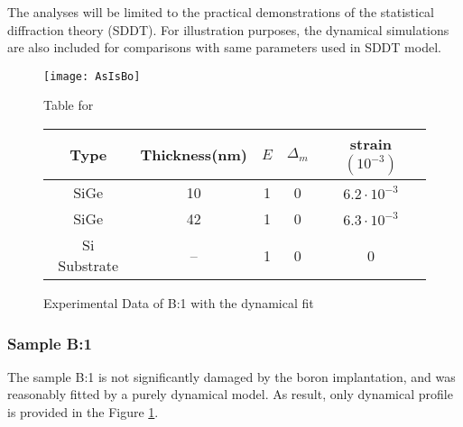 The analyses will be limited to the practical demonstrations of the statistical diffraction theory (SDDT).  For illustration purposes, the dynamical simulations are also included for comparisons with same parameters used in SDDT model.

%
\begin{figure}[ht]
\caption{Experimental Data of B:1 with the dynamical fit}
\label{B1:fig}
\begin{minipage}{\linewidth}
\texttt{[image: AsIsBo]}
\end{minipage}
\vfill
\begin{minipage}{\linewidth}
\vspace{10pt}
\centering
Table for \\
\begin{tabular}[htbp]{@{}c|cccc@{}}
    \hline
  Type & Thickness(nm) & $E$ & $\Delta_m$ & strain $(10^{-3})$ \\
    \hline
  SiGe & 10 & 1 & 0 & $6.2\cdot 10^{-3}$  \\
  SiGe & 42 & 1 & 0 & $6.3\cdot 10^{-3}$  \\
  Si Substrate & -- & 1 & 0 & 0
  \end{tabular}
 \end{minipage}
\end{figure}
%
\subsubsection{Sample B:1}

The sample B:1 is not significantly damaged by the boron implantation, and was reasonably fitted by a purely dynamical model.  As result, only dynamical profile is provided in the Figure \ref{B1:fig}.



